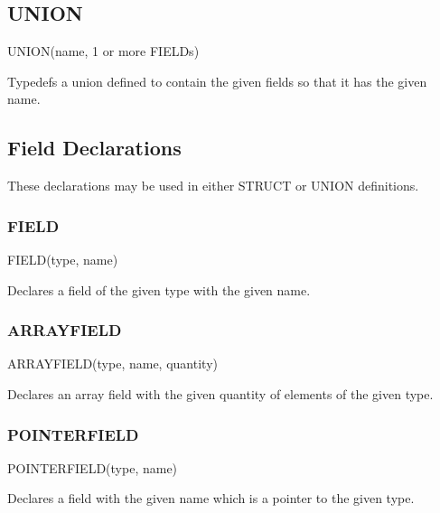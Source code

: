 \documentclass{article}
\begin{document}
\subsection{UNION}

UNION(name, 1 or more FIELDs)

Typedefs a union defined to contain the given fields so that it has
the given name.


\subsection{Field Declarations}

These declarations may be used in either STRUCT or UNION definitions.


\subsubsection{FIELD}

FIELD(type, name)

Declares a field of the given type with the given name.


\subsubsection{ARRAYFIELD}

ARRAYFIELD(type, name, quantity)

Declares an array field with the given quantity of elements of the
given type.


\subsubsection{POINTERFIELD}

POINTERFIELD(type, name)

Declares a field with the given name which is a pointer to the given
type.
\end{document}
